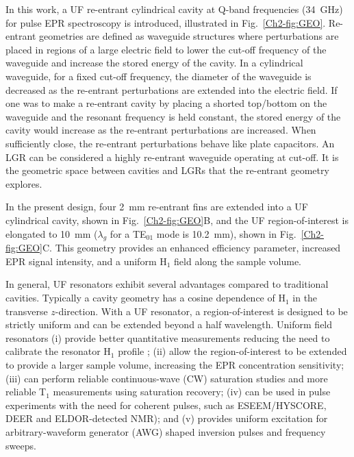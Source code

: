 In this work, a UF re-entrant cylindrical \cylTE{} cavity at Q-band frequencies (34~GHz) for pulse EPR spectroscopy is introduced, illustrated in Fig.~\ref{Ch2-fig:GEO}. Re-entrant geometries are defined as waveguide structures where perturbations are placed in regions of a large electric field to lower the cut-off frequency of the waveguide and increase the stored energy of the cavity. \cite{ramo1984fields, MITRadWaveguide} In a cylindrical waveguide, for a fixed cut-off frequency, the diameter of the waveguide is decreased as the re-entrant perturbations are extended into the electric field. If one was to make a re-entrant cavity by placing a shorted top/bottom on the waveguide and the resonant frequency is held constant, the stored energy of the cavity would increase as the re-entrant perturbations are increased. When sufficiently close, the re-entrant perturbations behave like plate capacitors. An LGR can be considered a highly re-entrant waveguide operating at cut-off. It is the geometric space between cavities and LGRs that the re-entrant geometry explores. 

In the present design, four 2~mm re-entrant fins are extended into a UF cylindrical \cylTE{} cavity, shown in Fig.~\ref{Ch2-fig:GEO}B, and the UF region-of-interest is elongated to 10~mm ($\lambda_g$ for a TE$_{01}$ mode is 10.2~mm), shown in Fig.~\ref{Ch2-fig:GEO}C. This geometry provides an enhanced efficiency parameter, increased EPR signal intensity, and a uniform H$_1$ field along the sample volume.

In general, UF resonators exhibit several advantages compared to traditional cavities. Typically a cavity geometry has a cosine dependence of H$_1$ in the transverse $z$-direction. With a UF resonator, a region-of-interest is designed to be strictly uniform and can be extended beyond a half wavelength. Uniform field resonators (i) provide better quantitative measurements reducing the need to calibrate the resonator H$_1$ profile \cite{eaton2010quantitative}; (ii) allow the region-of-interest to be extended to provide a larger sample volume, increasing the EPR concentration sensitivity; (iii) can perform reliable continuous-wave (CW) saturation studies \cite{klugsdsl} and more reliable T$_1$ measurements using saturation recovery;  (iv) can be used in pulse experiments with the need for coherent pulses, such as ESEEM/HYSCORE, DEER\cite{pulsejeschke} and ELDOR-detected NMR\cite{COX201763}); and (v) provides uniform excitation for arbitrary-waveform generator (AWG) shaped inversion pulses \cite{stollshaped, shapedpulse} and frequency sweeps. \cite{DOLL201746}

